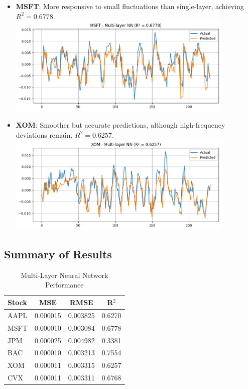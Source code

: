 \documentclass[12pt]{article}
\begin{document}
\begin{itemize}
  \item \textbf{MSFT}: More responsive to small fluctuations than single-layer, achieving $R^2 = 0.6778$.
  \includegraphics[width=0.85\textwidth]{MSFT_multi_layer_nn.png}

  \item \textbf{XOM}: Smoother but accurate predictions, although high-frequency deviations remain. $R^2 = 0.6257$.
  \includegraphics[width=0.85\textwidth]{XOM_multi_layer_nn.png}
\end{itemize}

\subsection{Summary of Results}
\begin{table}[h!]
\centering
\begin{tabular}{lccc}
\toprule
\textbf{Stock} & \textbf{MSE} & \textbf{RMSE} & \textbf{R$^2$} \\
\midrule
AAPL & 0.000015 & 0.003825 & 0.6270 \\
MSFT & 0.000010 & 0.003084 & 0.6778 \\
JPM  & 0.000025 & 0.004982 & 0.3381 \\
BAC  & 0.000010 & 0.003213 & 0.7554 \\
XOM  & 0.000011 & 0.003315 & 0.6257 \\
CVX  & 0.000011 & 0.003311 & 0.6768 \\
\bottomrule
\end{tabular}
\caption{Multi-Layer Neural Network Performance}
\end{table}
\end{document}
